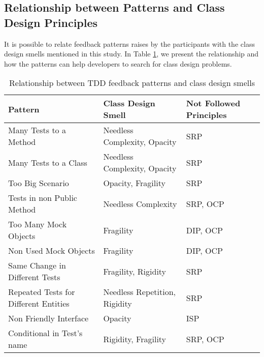 \documentclass[conference]{IEEEtran}
\begin{document}
\subsection{Relationship between Patterns and Class Design Principles}

It is possible to relate feedback patterns raises by the participants with the class design
smells mentioned in this study.
In Table \ref{tab:relacao-padroes}, we present the relationship and how the patterns
can help developers to search for class design problems.

\begin{table}[h!]
	\centering
	\begin{tabular}{| p{2.5cm} | p{2.5cm} | p{2cm} | }
		\hline

		\textbf{Pattern} & \textbf{Class Design Smell} & \textbf{Not Followed Principles}\\
		
		\hline

		Many Tests to a Method                   & Needless Complexity, Opacity   & SRP \\ \hline
		Many Tests to a Class                  & Needless Complexity, Opacity   & SRP \\ \hline
		Too Big Scenario                           & Opacity, Fragility                  & SRP \\ \hline
		Tests in non Public Method             & Needless Complexity              & SRP, OCP \\ \hline
		Too Many Mock Objects                       & Fragility                             & DIP, OCP \\ \hline
		Non Used Mock Objects                  & Fragility                             & DIP, OCP \\ \hline
		Same Change in Different Tests           & Fragility, Rigidity                    & SRP \\ \hline
		Repeated Tests for Different Entities     & Needless Repetition, Rigidity        & SRP  \\ \hline
		Non Friendly Interface                         & Opacity                               & ISP \\ \hline
		Conditional in Test's name                   & Rigidity, Fragility                    & SRP, OCP \\

		\hline
		
	\end{tabular}
	\caption{Relationship between TDD feedback patterns and class design smells}
	\label{tab:relacao-padroes}
\end{table}
\end{document}
